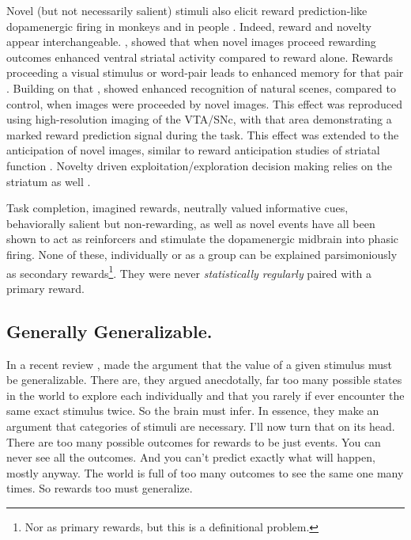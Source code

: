 \documentclass[doc,12pt]{apa}        %
\begin{document}
Novel (but not necessarily salient) stimuli also elicit reward prediction-like dopamenergic firing in monkeys \cite{Blatter:2006p6372} and in people \cite{Bunzeck:2006p5319}. Indeed, reward and novelty appear interchangeable.  , showed that when novel images proceed rewarding outcomes enhanced ventral striatal activity compared to reward alone.  Rewards proceeding a visual stimulus or word-pair leads to enhanced memory for that pair \cite{Lisman:2005p5455}.  Building on that , showed enhanced recognition of natural scenes, compared to control, when images were proceeded by novel images.  This effect was reproduced using high-resolution imaging of the VTA/SNc, with that area demonstrating a marked reward prediction signal during the task.  This effect was extended to the anticipation of novel images, similar to reward anticipation studies of striatal function \cite{Knutson:2001p5234}.  Novelty driven exploitation/exploration decision making relies on the striatum as well \cite{Wittmann:2008p541}.

Task completion, imagined rewards, neutrally valued informative cues, behaviorally salient but non-rewarding, as well as novel events have all been shown to act as reinforcers and stimulate the dopamenergic midbrain into phasic firing.  None of these, individually or as a group can be explained parsimoniously as secondary rewards\footnote{
Nor as primary rewards, but this is a definitional problem.
}.  They were never \emph{statistically regularly} paired with a primary reward.

\subsection{Generally Generalizable.}
\label{sub:gen}

In a recent review , made the argument that the value of a given stimulus must be generalizable.  There are, they argued anecdotally, far too many possible states in the world to explore each individually and that you rarely if ever encounter the same exact stimulus twice.  So the brain must infer.  In essence, they make an argument that categories of stimuli are necessary.  I'll now turn that on its head.  There are too many possible outcomes for rewards to be just events.  You can never see all the outcomes.  And you can't predict exactly what will happen, mostly anyway.  The world is full of too many outcomes to see the same one many times.   So rewards too must generalize.
\end{document}
